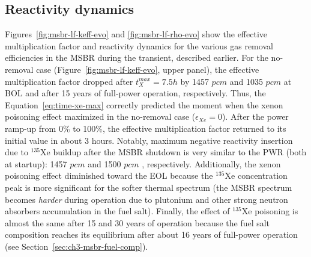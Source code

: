 \subsection{Reactivity dynamics}
Figures~\ref{fig:msbr-lf-keff-evo} and \ref{fig:msbr-lf-rho-evo} show the 
effective multiplication factor and reactivity dynamics for the various gas 
removal efficiencies in the \gls{MSBR} during the transient, 
described earlier. For the no-removal case (Figure~\ref{fig:msbr-lf-keff-evo}, 
upper panel), the effective multiplication factor dropped after 
$t^{max}_X=7.5h$ by 1457 $pcm$ and 1035 $pcm$ at \gls{BOL} and after 15 years 
of full-power operation, respectively. Thus, the Equation~\ref{eq:time-xe-max} 
correctly predicted the moment when the xenon poisoning effect maximized in the
no-removal case ($\epsilon_{Xe}=0$).
After the power ramp-up from 0\% to 100\%, the effective multiplication factor 
returned to its initial value in about 3 hours. Notably, maximum 
negative reactivity insertion due to $^{135}$Xe buildup after the 
\gls{MSBR} shutdown is very similar to the \gls{PWR} (both at startup): 1457 
$pcm$ and 1500 $pcm$ \cite{rykhlevskii_impact_2019}, respectively. 
Additionally, the xenon poisoning effect diminished toward the \gls{EOL} 
because the $^{135}$Xe concentration peak is more significant for the softer 
thermal spectrum (the \gls{MSBR} spectrum becomes \emph{harder} during  
operation due to plutonium and other strong neutron absorbers accumulation in 
the fuel salt).
Finally, the effect of $^{135}$Xe poisoning is almost the same after 15 and 30 
years of operation because the fuel salt composition reaches its equilibrium 
after about 16 years of full-power operation (see 
Section~\ref{sec:ch3-msbr-fuel-comp}).

